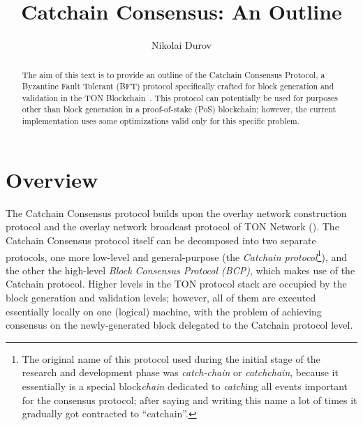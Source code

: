 \documentclass[12pt,oneside]{article}
\title{Catchain Consensus: An Outline}
\author{Nikolai Durov}
\def\mysection#1{\section{#1}\fancyhead[C]{\textsc{Chapter \textbf{\thesection.} #1}}}
\begin{document}
\maketitle

\begin{abstract}
  The aim of this text is to provide an outline of the Catchain Consensus Protocol, a Byzantine Fault Tolerant (BFT) protocol specifically crafted for block generation and validation in the TON Blockchain~\cite{TON}. This protocol can potentially be used for purposes other than block generation in a proof-of-stake (PoS) blockchain; however, the current implementation uses some optimizations valid only for this specific problem.
\end{abstract}

\tableofcontents
\clearpage

\mysection{Overview}\label{sect:overview}
The Catchain Consensus protocol builds upon the overlay network construction protocol and the overlay network broadcast protocol of TON Network (\cite{TON}). The Catchain Consensus protocol itself can be decomposed into two separate protocols, one more low-level and general-purpose (the {\em Catchain protocol\/}\footnote{The original name of this protocol used during the initial stage of the research and development phase was {\em catch-chain} or {\em catchchain}, because it essentially is a special block{\em chain} dedicated to {\em catch\/}ing all events important for the consensus protocol; after saying and writing this name a lot of times it gradually got contracted to ``catchain''.}), and the other the high-level {\em Block Consensus Protocol (BCP)}, which makes use of the Catchain protocol. Higher levels in the TON protocol stack are occupied by the block generation and validation levels; however, all of them are executed essentially locally on one (logical) machine, with the problem of achieving consensus on the newly-generated block delegated to the Catchain protocol level.
\end{document}
